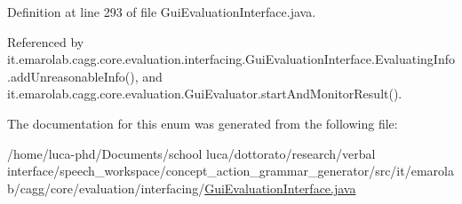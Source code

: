 Definition at line 293 of file Gui\-Evaluation\-Interface.\-java.



Referenced by it.\-emarolab.\-cagg.\-core.\-evaluation.\-interfacing.\-Gui\-Evaluation\-Interface.\-Evaluating\-Info.\-add\-Unreasonable\-Info(), and it.\-emarolab.\-cagg.\-core.\-evaluation.\-Gui\-Evaluator.\-start\-And\-Monitor\-Result().



The documentation for this enum was generated from the following file\-:\begin{DoxyCompactItemize}
\item 
/home/luca-\/phd/\-Documents/school luca/dottorato/research/verbal interface/speech\-\_\-workspace/concept\-\_\-action\-\_\-grammar\-\_\-generator/src/it/emarolab/cagg/core/evaluation/interfacing/\hyperlink{GuiEvaluationInterface_8java}{Gui\-Evaluation\-Interface.\-java}\end{DoxyCompactItemize}
